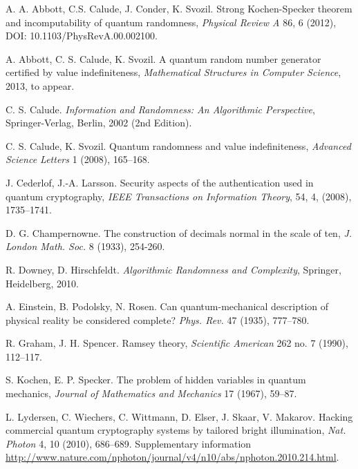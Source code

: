 \documentclass[%
 preprint,
 showpacs,
 showkeys,
 preprintnumbers,
  amsmath,amssymb,
  aps,
 pra,
  longbibliography,
  floatfix,
 ]{revtex4-1}
\theoremstyle{plain}
\begin{document}
\begin{thebibliography}{99}

\vspace*{-2.0mm}

 A. A. Abbott, C.S. Calude, J. Conder, K. Svozil.
Strong Kochen-Specker theorem  and incomputability of quantum randomness,
{\em Physical Review A} 86, 6 (2012),  DOI: 10.1103/PhysRevA.00.002100.

 A. Abbott, C. S. Calude, K. Svozil. A quantum random number generator certified by value indefiniteness, {\em Mathematical Structures in Computer Science},  2013, to appear.


 C. S. Calude. {\em Information and Randomness: An Algorithmic Perspective},  Springer-Verlag, Berlin, 2002
(2nd Edition).

 C. S. Calude, K. Svozil. Quantum randomness and value indefiniteness, {\em Advanced Science Letters} 1 (2008), 165--168.


 J. Cederlof, J.-A. Larsson. Security aspects of the authentication used in quantum cryptography, {\em  IEEE Transactions on Information Theory}, 54, 4,  (2008), 1735--1741.


D. G. Champernowne. The construction of decimals normal in the
scale of ten, {\em  J.   London Math. Soc.} 8
(1933), 254-260.

 R. Downey, D. Hirschfeldt. {\em Algorithmic Randomness
    and Complexity}, Springer, Heidelberg,  2010.

     A. Einstein, B. Podolsky, N. Rosen. Can quantum-mechanical description of physical reality be considered complete?
{\em  Phys. Rev.} 47 (1935),  777--780.


R. Graham, J. H. Spencer. Ramsey theory,  {\em Scientific American} 262 no. 7 (1990), 112--117.

  S. Kochen, E. P. Specker. The problem of hidden variables in quantum mechanics, {\em Journal of Mathematics and Mechanics}
 17 (1967), 59--87.

 L. Lydersen, C.  Wiechers, C.  Wittmann, D. Elser, J.  Skaar,
V. Makarov.
Hacking commercial quantum cryptography systems by tailored bright illumination,
{\em  Nat. Photon} 4, 10 (2010), 686--689. Supplementary information
\url{http://www.nature.com/nphoton/journal/v4/n10/abs/nphoton.2010.214.html}.


\end{thebibliography}
\end{document}
